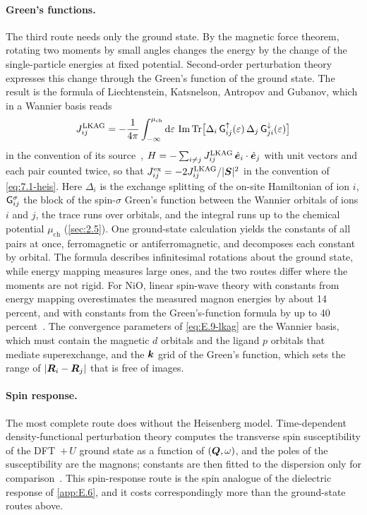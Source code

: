 \paragraph{Green's functions.} The third route needs only the ground state. By the magnetic force theorem, rotating two moments by small angles changes the energy by the change of the single-particle energies at fixed potential. Second-order perturbation theory expresses this change through the Green's function of the ground state. The result is the formula of Liechtenstein, Katsnelson, Antropov and Gubanov, which in a Wannier basis reads
\begin{equation}
  J^{\mathrm{LKAG}}_{ij} = -\frac{1}{4\pi}\int_{-\infty}^{\mu_{\mathrm{ch}}}\mathrm{d}\varepsilon\,\operatorname{Im}\operatorname{Tr}\bigl[\Delta_i\,\mathsf{G}^{\uparrow}_{ij}(\varepsilon)\,\Delta_j\,\mathsf{G}^{\downarrow}_{ji}(\varepsilon)\bigr]
  \label{eq:E.9-lkag}
\end{equation}
in the convention of its source~\cite[Eq.~(19) and Table~1]{he2021tb2j}, $H = -\sum_{i\neq j}J^{\mathrm{LKAG}}_{ij}\,\hat{\bm{e}}_i\cdot\hat{\bm{e}}_j$ with unit vectors and each pair counted twice, so that $J^{\mathrm{ex}}_{ij} = -2J^{\mathrm{LKAG}}_{ij}/|\bm{S}|^2$ in the convention of \cref{eq:7.1-heis}. Here $\Delta_i$ is the exchange splitting of the on-site Hamiltonian of ion $i$, $\mathsf{G}^\sigma_{ij}$ the block of the spin-$\sigma$ Green's function between the Wannier orbitals of ions $i$ and $j$, the trace runs over orbitals, and the integral runs up to the chemical potential $\mu_{\mathrm{ch}}$ (\cref{sec:2.5}). One ground-state calculation yields the constants of all pairs at once, ferromagnetic or antiferromagnetic, and decomposes each constant by orbital. The formula describes infinitesimal rotations about the ground state, while energy mapping measures large ones, and the two routes differ where the moments are not rigid. For NiO, linear spin-wave theory with constants from energy mapping overestimates the measured magnon energies by about 14 percent, and with constants from the Green's-function formula by up to 40 percent~\cite[Sect.~III]{dossantos2026comparative}. The convergence parameters of \cref{eq:E.9-lkag} are the Wannier basis, which must contain the magnetic $d$ orbitals and the ligand $p$ orbitals that mediate superexchange, and the $\bm{k}$ grid of the Green's function, which sets the range of $|\bm{R}_i - \bm{R}_j|$ that is free of images.

\paragraph{Spin response.} The most complete route does without the Heisenberg model. Time-dependent density-functional perturbation theory computes the transverse spin susceptibility of the DFT~$+\,U$ ground state as a function of $(\bm{Q},\omega)$, and the poles of the susceptibility are the magnons; constants are then fitted to the dispersion only for comparison~\cite[Sect.~II]{dossantos2026comparative}. This spin-response route is the spin analogue of the dielectric response of \cref{app:E.6}, and it costs correspondingly more than the ground-state routes above.

